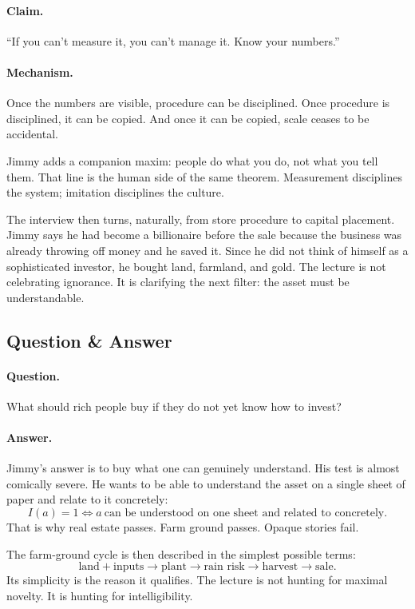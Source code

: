 \paragraph{Claim.} ``If you can't measure it, you can't manage it. Know your numbers.''

\paragraph{Mechanism.} Once the numbers are visible, procedure can be disciplined. Once procedure is disciplined, it can be copied. And once it can be copied, scale ceases to be accidental.

Jimmy adds a companion maxim: people do what you do, not what you tell them. That line is the human side of the same theorem. Measurement disciplines the system; imitation disciplines the culture.

The interview then turns, naturally, from store procedure to capital placement. Jimmy says he had become a billionaire before the sale because the business was already throwing off money and he saved it. Since he did not think of himself as a sophisticated investor, he bought land, farmland, and gold. The lecture is not celebrating ignorance. It is clarifying the next filter: the asset must be understandable.

\subsection{Question \& Answer}

\paragraph{Question.} What should rich people buy if they do not yet know how to invest?

\paragraph{Answer.} Jimmy's answer is to buy what one can genuinely understand. His test is almost comically severe. He wants to be able to understand the asset on a single sheet of paper and relate to it concretely:
\begin{equation}
I(a)=1 \iff a\ \text{can be understood on one sheet and related to concretely}.
\end{equation}
That is why real estate passes. Farm ground passes. Opaque stories fail.

The farm-ground cycle is then described in the simplest possible terms:
\begin{equation}
\text{land}+\text{inputs}\rightarrow \text{plant}\rightarrow \text{rain risk}\rightarrow \text{harvest}\rightarrow \text{sale}.
\end{equation}
Its simplicity is the reason it qualifies. The lecture is not hunting for maximal novelty. It is hunting for intelligibility.

